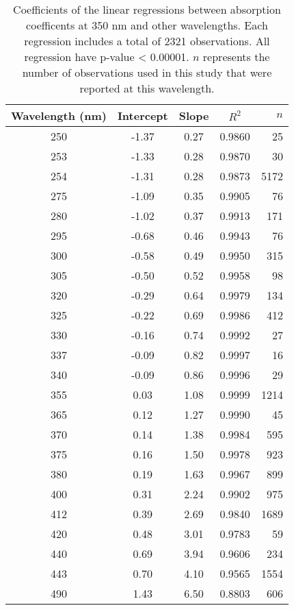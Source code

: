 \begin{table}[ht]
\centering
\begin{tabular}{ccccr}
  \hline
Wavelength (nm) & Intercept & Slope & $R^2$ & $n$ \\ 
  \hline
250 & -1.37 & 0.27 & 0.9860 & 25 \\ 
  253 & -1.33 & 0.28 & 0.9870 & 30 \\ 
  254 & -1.31 & 0.28 & 0.9873 & 5172 \\ 
  275 & -1.09 & 0.35 & 0.9905 & 76 \\ 
  280 & -1.02 & 0.37 & 0.9913 & 171 \\ 
  295 & -0.68 & 0.46 & 0.9943 & 76 \\ 
  300 & -0.58 & 0.49 & 0.9950 & 315 \\ 
  305 & -0.50 & 0.52 & 0.9958 & 98 \\ 
  320 & -0.29 & 0.64 & 0.9979 & 134 \\ 
  325 & -0.22 & 0.69 & 0.9986 & 412 \\ 
  330 & -0.16 & 0.74 & 0.9992 & 27 \\ 
  337 & -0.09 & 0.82 & 0.9997 & 16 \\ 
  340 & -0.09 & 0.86 & 0.9996 & 29 \\ 
  355 & 0.03 & 1.08 & 0.9999 & 1214 \\ 
  365 & 0.12 & 1.27 & 0.9990 & 45 \\ 
  370 & 0.14 & 1.38 & 0.9984 & 595 \\ 
  375 & 0.16 & 1.50 & 0.9978 & 923 \\ 
  380 & 0.19 & 1.63 & 0.9967 & 899 \\ 
  400 & 0.31 & 2.24 & 0.9902 & 975 \\ 
  412 & 0.39 & 2.69 & 0.9840 & 1689 \\ 
  420 & 0.48 & 3.01 & 0.9783 & 59 \\ 
  440 & 0.69 & 3.94 & 0.9606 & 234 \\ 
  443 & 0.70 & 4.10 & 0.9565 & 1554 \\ 
  490 & 1.43 & 6.50 & 0.8803 & 606 \\ 
   \hline
\end{tabular}
\caption{Coefficients of the linear regressions between absorption 
coefficents at 350 nm and other wavelengths. Each regression includes a total 
of 2321 observations. All regression have p-value < 0.00001.  $n$ represents 
the number of observations used in this study that were reported at this 
wavelength.} 
\end{table}
